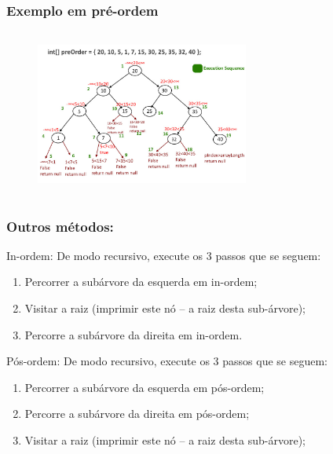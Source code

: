 \begin{frame}
  \frametitle{Exemplo em pré-ordem}
  
 \begin{figure}[!ht]
     \centering
    \includegraphics[width=7cm, height=5.5cm]{figs/fig_arvores/preorder_transversal.jpg}
    \end{figure}

\end{frame}


\begin{frame}
  
  \frametitle{Outros métodos:}
  
\begin{block}{In-ordem:}
  De modo recursivo, execute os 3 passos que se seguem:
\begin{enumerate}
 \item Percorrer a subárvore da esquerda em in-ordem;
  \item Visitar a raiz (imprimir este nó -- a raiz desta sub-árvore);
 \item Percorre a subárvore da direita em in-ordem.
\end{enumerate}
 \end{block}

  
\begin{block}{Pós-ordem:}
  De modo recursivo, execute os 3 passos que se seguem:
\begin{enumerate}
 \item Percorrer a subárvore da esquerda em pós-ordem;
 \item Percorre a subárvore da direita em pós-ordem;
  \item Visitar a raiz (imprimir este nó -- a raiz desta sub-árvore);
\end{enumerate}
 \end{block}


\end{frame}

